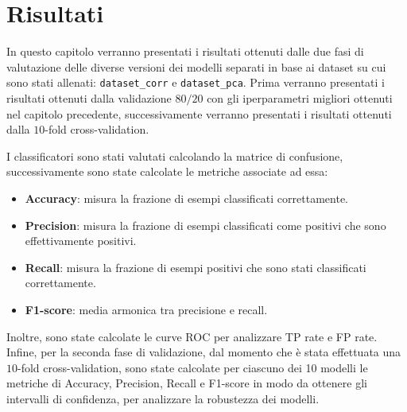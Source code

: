 \chapter{Risultati} \label{chp:risultati}
In questo capitolo verranno presentati i risultati ottenuti dalle due fasi di
valutazione delle diverse versioni dei modelli separati in base ai dataset su
cui sono stati allenati: \texttt{dataset\_corr} e \texttt{dataset\_pca}. Prima
verranno presentati i risultati ottenuti dalla validazione $80/20$ con gli
iperparametri migliori ottenuti nel capitolo precedente, successivamente
verranno presentati i risultati ottenuti dalla $10$-fold cross-validation.



I classificatori sono stati valutati calcolando la matrice di confusione,
successivamente sono state calcolate le metriche associate ad essa:
\begin{itemize}
    \item \textbf{Accuracy}: misura la frazione di esempi classificati
          correttamente.
    \item \textbf{Precision}: misura la frazione di esempi classificati come
          positivi che sono effettivamente positivi.
    \item \textbf{Recall}: misura la frazione di esempi positivi che sono stati
          classificati correttamente.
    \item \textbf{F1-score}: media armonica tra precisione e recall.
\end{itemize}
Inoltre, sono state calcolate le curve ROC per analizzare TP rate e FP rate.
Infine, per la seconda fase di validazione, dal momento che è stata effettuata
una $10$-fold cross-validation, sono state calcolate per ciascuno dei 10
modelli le metriche di Accuracy, Precision, Recall e F1-score in modo da
ottenere gli intervalli di confidenza, per analizzare la robustezza dei modelli.

